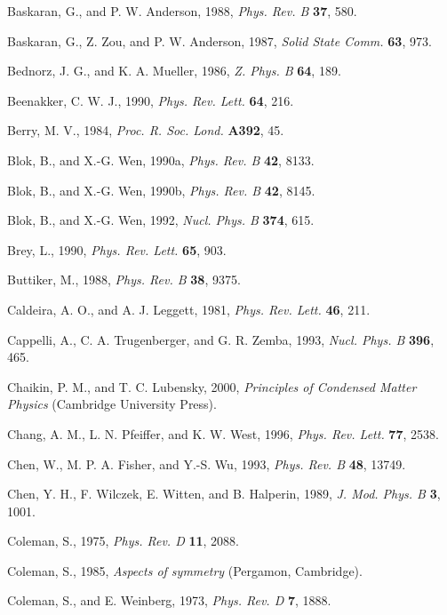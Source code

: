 \begin{list}{}{\setlength{\leftmargin}{2em}\setlength{\itemindent}{-2em}}
\item Baskaran, G., and P. W. Anderson, 1988, \emph{Phys. Rev. B} \textbf{37}, 580.
\item Baskaran, G., Z. Zou, and P. W. Anderson, 1987, \emph{Solid State Comm.} \textbf{63}, 973.
\item Bednorz, J. G., and K. A. Mueller, 1986, \emph{Z. Phys. B} \textbf{64}, 189.
\item Beenakker, C. W. J., 1990, \emph{Phys. Rev. Lett.} \textbf{64}, 216.
\item Berry, M. V., 1984, \emph{Proc. R. Soc. Lond.} \textbf{A392}, 45.
\item Blok, B., and X.-G. Wen, 1990a, \emph{Phys. Rev. B} \textbf{42}, 8133.
\item Blok, B., and X.-G. Wen, 1990b, \emph{Phys. Rev. B} \textbf{42}, 8145.
\item Blok, B., and X.-G. Wen, 1992, \emph{Nucl. Phys. B} \textbf{374}, 615.
\item Brey, L., 1990, \emph{Phys. Rev. Lett.} \textbf{65}, 903.
\item Buttiker, M., 1988, \emph{Phys. Rev. B} \textbf{38}, 9375.
\item Caldeira, A. O., and A. J. Leggett, 1981, \emph{Phys. Rev. Lett.} \textbf{46}, 211.
\item Cappelli, A., C. A. Trugenberger, and G. R. Zemba, 1993, \emph{Nucl. Phys. B} \textbf{396}, 465.
\item Chaikin, P. M., and T. C. Lubensky, 2000, \emph{Principles of Condensed Matter Physics} (Cambridge University Press).
\item Chang, A. M., L. N. Pfeiffer, and K. W. West, 1996, \emph{Phys. Rev. Lett.} \textbf{77}, 2538.
\item Chen, W., M. P. A. Fisher, and Y.-S. Wu, 1993, \emph{Phys. Rev. B} \textbf{48}, 13749.
\item Chen, Y. H., F. Wilczek, E. Witten, and B. Halperin, 1989, \emph{J. Mod. Phys. B} \textbf{3}, 1001.
\item Coleman, S., 1975, \emph{Phys. Rev. D} \textbf{11}, 2088.
\item Coleman, S., 1985, \emph{Aspects of symmetry} (Pergamon, Cambridge).
\item Coleman, S., and E. Weinberg, 1973, \emph{Phys. Rev. D} \textbf{7}, 1888.


\end{list}
